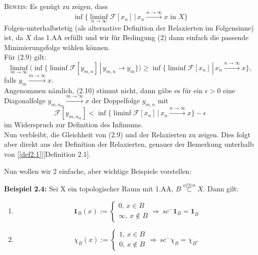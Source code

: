 \textsc{Beweis:} Es genügt zu zeigen, dass
\begin{equation}
    \inf\{\liminf_{n \to \infty} \mathcal{F}[x_n] \, | \, x_n \stackrel{n \to \infty}{\to} x \text{ in } X\}
\end{equation}
Folgen-unterhalbstetig (als alternative Definition der Relaxierten im Folgensinne) ist, da \(X\) das 1.AA erfüllt und wir für Bedingung (2) dann einfach die passende Minimierungsfolge wählen können.\\
Für (2.9) gilt:
\begin{equation}
    \liminf_{m \to \infty}(\inf\{\liminf \mathcal{F}[y_{m,n}]\, | \, y_{m,n} \to y_m\}) \geq \inf\{\liminf \mathcal{F}[x_n]\, | \, x_n \stackrel{n \to \infty}{\to} x\},
\end{equation}
falls \(y_m \stackrel{m \to \infty}{\to} x\).\\
Angenommen nämlich, (2.10) stimmt nicht, dann gäbe es für ein \(\epsilon > 0\) eine Diagonalfolge \(y_{m,n_m} \stackrel{m \to \infty}{\to} x\) der Doppelfolge \(y_{m,n}\) mit
\begin{equation}
    \mathcal{F}[y_{m,n_m}] < \inf \{\liminf \mathcal{F}[x_n]\, | \, x_n \stackrel{n \to \infty}{\to} x\} - \epsilon
\end{equation}
im Widerspruch zur Definition des Infimums.\\
Nun verbleibt, die Gleichheit von (2.9) und der Relaxierten zu zeigen. Dies folgt aber direkt aus der Definition der Relaxierten, genauer der Bemerkung unterhalb von [\ref{def2.1}][Definition 2.1].\QEDB

Nun wollen wir 2 einfache, aber wichtige Beispiele vorstellen:\\
\colorbox{propgreen}{\begin{minipage}{16cm}{\textcolor{black}{}{\label{ex2.4}}}
\textbf{Beispiel 2.4:} Sei X ein topologischer Raum mit 1.AA, \(B \stackrel{offen}{\subset} X\). Dann gilt:
\begin{enumerate}
    \item \begin{equation}
        \mathbf{1}_B(x) :=\begin{cases} 0, \, x \in B\\ \infty, \, x \notin B\end{cases} \Rightarrow\,sc^- \mathbf{1}_B = \mathbf{1}_{\overline{B}}
    \end{equation}
    \item \begin{equation}
        \chi_B(x) :=\begin{cases} 1, \, x \in B\\ 0, \, x \notin B \end{cases}\Rightarrow\,sc^- \chi_B = \chi_{B^c}
    \end{equation}
\end{enumerate}
\end{minipage}}

